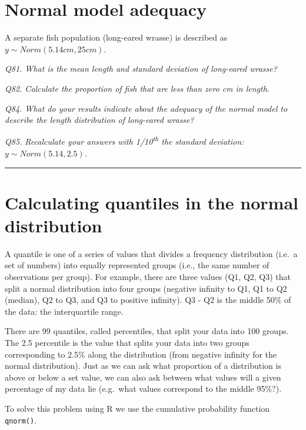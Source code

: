 \documentclass[
  11pt,
  a4paper,
]{book}
\begin{document}
\hypertarget{normal-model-adequacy}{%
\section{Normal model adequacy}\label{normal-model-adequacy}}

A separate fish population (long-eared wrasse) is described as \(y \sim Norm(5.14 cm, 25 cm)\).

\emph{Q81. What is the mean length and standard deviation of long-eared wrasse?}

\emph{Q82. Calculate the proportion of fish that are less than zero cm in length.}

\emph{Q84. What do your results indicate about the adequacy of the normal model to describe the length distribution of long-eared wrasse?}

\emph{Q85. Recalculate your answers with 1/10\textsuperscript{th} the standard deviation:} \(y \sim Norm(5.14, 2.5)\)\emph{.}

\begin{center}\rule{0.5\linewidth}{0.5pt}\end{center}

\hypertarget{calculating-quantiles-in-the-normal-distribution}{%
\section{Calculating quantiles in the normal distribution}\label{calculating-quantiles-in-the-normal-distribution}}

A quantile is one of a series of values that divides a frequency distribution (i.e.~a set of numbers) into equally represented groups (i.e., the same number of observations per group). For example, there are three values (Q1, Q2, Q3) that split a normal distribution into four groups (negative infinity to Q1, Q1 to Q2 (median), Q2 to Q3, and Q3 to positive infinity). Q3 - Q2 is the middle 50\% of the data: the interquartile range.

There are 99 quantiles, called percentiles, that split your data into 100 groups. The 2.5 percentile is the value that splits your data into two groups corresponding to 2.5\% along the distribution (from negative infinity for the normal distribution). Just as we can ask what proportion of a distribution is above or below a set value, we can also ask between what values will a given percentage of my data lie (e.g.~what values correspond to the middle 95\%?).

To solve this problem using R we use the cumulative probability function \texttt{qnorm()}.
\end{document}

